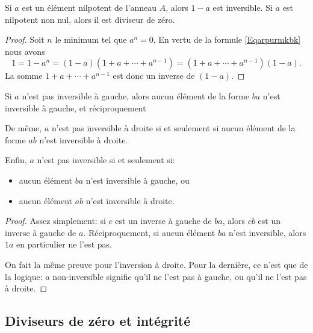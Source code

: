 \begin{proposition}
    Si \( a\) est un élément nilpotent de l'anneau \( A\), alors \( 1-a\) est inversible. Si \( a\) est nilpotent non nul, alors il est diviseur de zéro.
\end{proposition}

\begin{proof}
    Soit \( n\) le minimum tel que \( a^n=0\). En vertu de la formule \eqref{Eqarpurmkbk} nous avons
    \begin{equation}
        1=1-a^n=(1-a)(1+a+\cdots+a^{n-1})=(1+a+\cdots+a^{n-1})(1-a).
    \end{equation}
    La somme \( 1+a+\cdots+a^{n-1}\) est donc un inverse de \( (1-a)\).
\end{proof}

\begin{proposition}   \label{PROP_inversibiliteEtProduits}
    Si \( a \) n'est pas inversible à gauche, alors aucun élément de la forme \( ba \) n'est inversible à gauche, et réciproquement
    
    De même, \( a \) n'est pas inversible à droite si et seulement si aucun élément de la forme \( ab \) n'est inversible à droite.
    
    Enfin, \( a \) n'est pas inversible si et seulement si:
    \begin{itemize}
    \item aucun élément \( ba \) n'est inversible à gauche, ou
    \item aucun élément \( ab \) n'est inversible à droite.
    \end{itemize}
\end{proposition}

\begin{proof}
  Assez simplement: si \( c \) est un inverse à gauche de \( ba \), alors \( cb \) est un inverse à gauche de \( a \). Réciproquement, si aucun élément \( ba \) n'est inversible, alors \( 1a \) en particulier ne l'est pas.
  
  On fait la même preuve pour l'inversion à droite. Pour la dernière, ce n'est que de la logique: \( a \) non-inversible signifie qu'il ne l'est pas à gauche, ou qu'il ne l'est pas à droite.
\end{proof}

\subsection{Diviseurs de zéro et intégrité}


